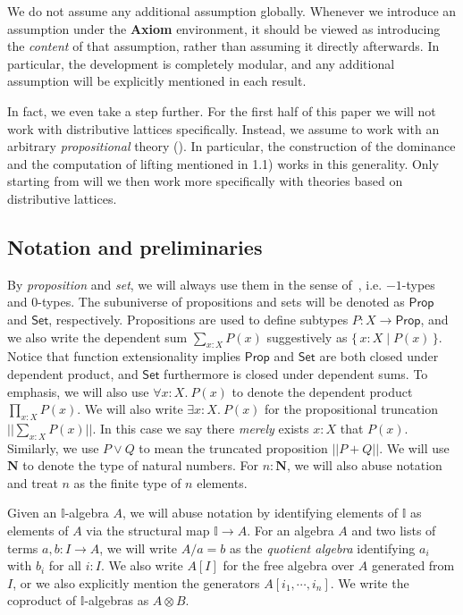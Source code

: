 \documentclass[12pt]{amsart}
\theoremstyle{definition}
\newcommand{\mb}[1]{\mathbf{#1}}
\newcommand{\mbb}[1]{\mathbb{#1}}
\newcommand{\I}{\mbb I}
\newcommand{\ms}[1]{\mathsf{#1}}
\newcommand{\scomp}[2]{\{\,#1\mid#2\,\}}
\newcommand{\N}{\mb N}
\newcommand{\fa}[2]{\forall #1\!\colon\!\!#2.\ }
\newcommand{\ex}[2]{\exists #1\!\colon\!\!#2.\ }
\newcommand{\pss}[1]{||#1||} %
\newcommand{\pp}{\ms{Prop}}
\newcommand{\st}{\ms{Set}}
\begin{document}
We do not assume any additional assumption globally. Whenever we introduce an assumption under the \textbf{Axiom} environment, it should be viewed as introducing the \emph{content} of that assumption, rather than assuming it directly afterwards. In particular, the development is completely modular, and any additional assumption will be explicitly mentioned in each result.

In fact, we even take a step further. For the first half of this paper we will not work with distributive lattices specifically. Instead, we assume to work with an arbitrary \emph{propositional} theory (). In particular, the construction of the dominance and the computation of lifting mentioned in 1.1) works in this generality. Only starting from  will we then work more specifically with theories based on distributive lattices.

\subsection*{Notation and preliminaries}

By \emph{proposition} and \emph{set}, we will always use them in the sense of~\cite{hottbook}, i.e. $-1$-types and $0$-types. The subuniverse of propositions and sets will be denoted as $\pp$ and $\st$, respectively. Propositions are used to define subtypes $P : X \to \pp$, and we also write the dependent sum $\sum_{x:X}P(x)$ suggestively as $\scomp{x:X}{P(x)}$. Notice that function extensionality implies $\pp$ and $\st$ are both closed under dependent product, and $\st$ furthermore is closed under dependent sums. To emphasis, we will also use $\fa xXP(x)$ to denote the dependent product $\prod_{x:X}P(x)$. We will also write $\ex xXP(x)$ for the propositional truncation $\pss{\sum_{x:X}P(x)}$. In this case we say there \emph{merely} exists $x:X$ that $P(x)$. Similarly, we use $P \vee Q$ to mean the truncated proposition $\pss{P + Q}$. We will use $\N$ to denote the type of natural numbers. For $n:\N$, we will also abuse notation and treat $n$ as the finite type of $n$ elements. 

Given an $\I$-algebra $A$, we will abuse notation by identifying elements of $\I$ as elements of $A$ via the structural map $\I \to A$. For an algebra $A$ and two lists of terms $a,b : I \to A$, we will write $A/a = b$ as the \emph{quotient algebra} identifying $a_i$ with $b_i$ for all $i : I$. We also write $A[I]$ for the free algebra over $A$ generated from $I$, or we also explicitly mention the generators $A[i_1,\cdots,i_n]$. We write the coproduct of $\I$-algebras as $A \otimes B$.
\end{document}
